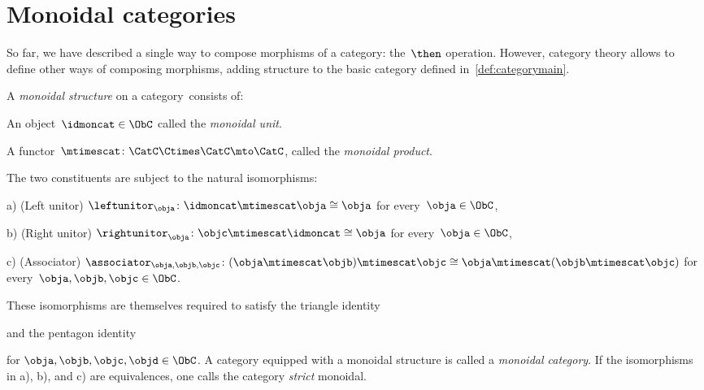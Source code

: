 

\section{Monoidal categories}
\label{sec:parallelism-mon-cat}

So far, we have described a single way to compose morphisms of a category: the~$\then$ operation. However, category theory allows to define other ways of composing morphisms, adding structure to the basic category defined in~\cref{def:categorymain}.


\begin{ctdefinition}
  \label{def:monoidal_cat}
  A \emph{monoidal structure} on a category~\CatC consists of:
  \begin{compactenum}
    \item An object~$\idmoncat \in \ObC$ called the \emph{monoidal unit}.
    \item A functor~$\mtimescat \colon \CatC \Ctimes \CatC\mto \CatC$, called the \emph{monoidal product}.
  \end{compactenum}
  The two constituents are subject to the natural isomorphisms:
  \begin{compactenum}
    \item[a)] (Left unitor) $\leftunitor_\obja \colon \idmoncat\mtimescat \obja \cong \obja$ for every~$\obja\in \ObC$,
    \item[b)] (Right unitor) $\rightunitor_\obja \colon \objc \mtimescat \idmoncat \cong \obja$ for every~$\obja\in \ObC$,
    \item[c)] (Associator) $\associator_{\obja,\objb,\objc}\colon (\obja \mtimescat \objb )\mtimescat \objc \cong \obja\mtimescat (\objb \mtimescat \objc)$ for every~$\obja,\objb,\objc\in \ObC$.
  \end{compactenum}
  These isomorphisms are themselves required to satisfy the triangle identity
  \begin{center}
  \end{center}
  and the pentagon identity
  \begin{center}
  \end{center}
  for $\obja,\objb,\objc,\objd\in \ObC$.
  \noindent A category equipped with a monoidal structure is called a \emph{monoidal category}.
  If the isomorphisms in a), b), and c) are equivalences, one calls the category \emph{strict} monoidal.
\end{ctdefinition}

